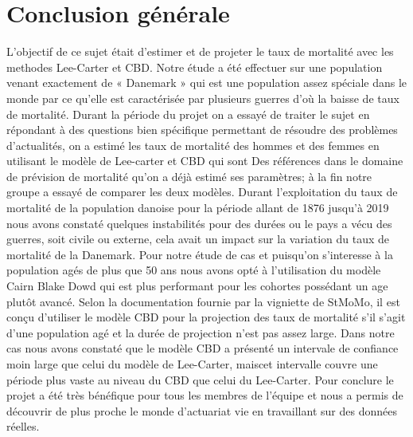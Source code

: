 \chapter*{Conclusion générale}
L’objectif de ce sujet était d’estimer et de projeter le taux de mortalité avec  les methodes Lee-Carter et CBD. Notre étude a été effectuer sur une population venant exactement de « Danemark » qui est une population assez spéciale dans le monde par ce qu’elle est caractérisée par plusieurs guerres d’où la baisse de taux de mortalité. Durant la période du projet on a essayé de traiter le sujet en répondant à des questions bien spécifique permettant de résoudre des problèmes d’actualités, on a estimé les taux de mortalité des hommes et des femmes en utilisant le modèle de Lee-carter et CBD qui sont Des références dans le domaine de prévision de mortalité qu’on a déjà estimé ses paramètres; à la fin notre groupe a essayé de comparer les deux modèles. 
Durant l'exploitation du taux de mortalité de la population danoise pour la période allant de 1876 jusqu'à 2019 nous avons constaté quelques instabilités pour des durées ou le pays a vécu des guerres, soit civile ou externe, cela avait un impact sur la variation du taux de mortalité de la Danemark.
Pour notre étude de cas et puisqu'on s'interesse à la population agés de plus que 50 ans nous avons opté à l'utilisation du modèle Cairn Blake Dowd qui est plus performant pour les cohortes possédant un age plutôt avancé. Selon la documentation fournie par la vigniette de StMoMo, il est conçu d'utiliser le modèle CBD pour la projection des taux de mortalité s'il s'agit d'une population agé et la durée de projection n'est pas assez large.
Dans notre cas nous avons constaté que le modèle CBD a présenté un intervale de confiance moin large que celui du modèle de Lee-Carter, maiscet intervalle couvre une période plus vaste au niveau du CBD que celui du Lee-Carter.
Pour conclure le projet a été très bénéfique pour tous les membres de l’équipe et nous a permis de découvrir de plus proche le monde d’actuariat vie en travaillant sur des données réelles.